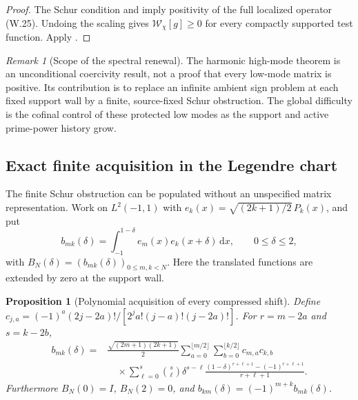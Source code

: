 \documentclass[11pt]{article}
\newtheorem{proposition}[theorem]{Proposition}
\theoremstyle{definition}
\theoremstyle{remark}
\newtheorem{remark}[theorem]{Remark}
\newcommand{\dd}{\mathrm d}
\begin{document}
\begin{proof}
The Schur condition and  imply positivity of the full
localized operator \textup{(W.25)}.  Undoing the scaling gives
$\mathcal W_\chi[g]\ge0$ for every compactly supported test function.  Apply
.
\end{proof}

\begin{remark}[Scope of the spectral renewal]
The harmonic high-mode theorem is an unconditional coercivity result, not a
proof that every low-mode matrix is positive.  Its contribution is to replace
an infinite ambient sign problem at each fixed support wall by a finite,
source-fixed Schur obstruction.  The global difficulty is the cofinal control
of these protected low modes as the support and active prime-power history
grow.
\end{remark}


\subsection{Exact finite acquisition in the Legendre chart}
\label{subsec:weil-acquisition}

The finite Schur obstruction can be populated without an unspecified
matrix representation.  Work on $L^2(-1,1)$ with
$e_k(x)=\sqrt{(2k+1)/2}\,P_k(x)$, and put
\begin{equation}
 b_{mk}(\delta)=\int_{-1}^{1-\delta}e_m(x)e_k(x+\delta)\,\dd x,
 \qquad 0\le\delta\le2,
 \label{eq:acq-translation}
\end{equation}
with $B_N(\delta)=(b_{mk}(\delta))_{0\le m,k<N}$.
Here the translated functions are extended by zero at the support wall.

\begin{proposition}[Polynomial acquisition of every compressed shift]
\label{prop:acq-shift}
Define
$c_{j,a}=(-1)^a(2j-2a)!/[2^ja!(j-a)!(j-2a)!]$.
For $r=m-2a$ and $s=k-2b$,
\begin{equation}
\begin{split}
 b_{mk}(\delta)
 ={}&\frac{\sqrt{(2m+1)(2k+1)}}2
 \sum_{a=0}^{\lfloor m/2\rfloor}
 \sum_{b=0}^{\lfloor k/2\rfloor}c_{m,a}c_{k,b}\\
 &\quad\times\sum_{\ell=0}^{s}\binom{s}{\ell}\delta^{s-\ell}
 \frac{(1-\delta)^{r+\ell+1}-(-1)^{r+\ell+1}}
 {r+\ell+1}.
\end{split}
\label{eq:acq-shift-polynomial}
\end{equation}
Furthermore $B_N(0)=I$, $B_N(2)=0$, and
$b_{km}(\delta)=(-1)^{m+k}b_{mk}(\delta)$.
\end{proposition}
\end{document}
